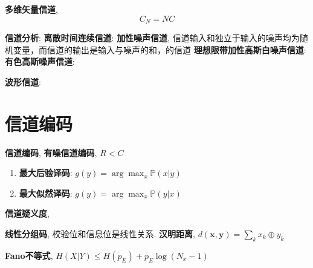 \documentclass{article}
\newcommand{\env}[2]{\begin{#1}#2\end{#1}}
\newcommand{\defi}[2]{\textbf{#1}, #2}
\newcommand{\bb}{\boldsymbol}
\newcommand{\P}{\mathbb P}
\begin{document}
            \defi{多维矢量信道}{\[C_N = N C\]}

          
    \textbf{信道分析}: 
        \textbf{离散时间连续信道}: 
        \defi{加性噪声信道}{信道输入和独立于输入的噪声均为随机变量，而信道的输出是输入与噪声的和，的信道}
            \textbf{理想限带加性高斯白噪声信道}: 
            \textbf{有色高斯噪声信道}: 

    \textbf{波形信道}: 


    \section{信道编码}
        \defi{信道编码}{}
            \defi{有噪信道编码}{$R<C$}

        \env{enumerate}{
        \item \textbf{最大后验译码}: $g(y) = \arg\max_x \P(x|y)$
        \item \textbf{最大似然译码}: $g(y) = \arg\max_x \P(y|x)$
        }

        \defi{信道疑义度}{}

        \defi{线性分组码}{校验位和信息位是线性关系.}
            \defi{汉明距离}{$d(\bb x, \bb y) = \sum_k x_k \oplus y_k$}

        \defi{Fano不等式}{$H(X|Y) \le H(p_E) + p_E \log(N_x - 1)$}
        
\end{document}
